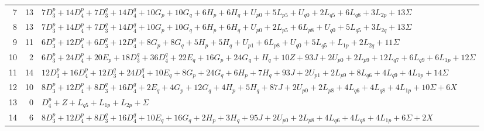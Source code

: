 \documentclass[11pt,a4paper]{article}
\theoremstyle{remark}
\begin{document}
\begin{longtable}{rrp{13.8cm}}
7&13&\( 7D_{3}^{p}+\allowbreak 14D_{4}^{p}+\allowbreak 7D_{3}^{q}+\allowbreak 14D_{4}^{q}+\allowbreak 10G_p+\allowbreak 10G_q+\allowbreak 6H_p+\allowbreak 6H_q+\allowbreak U_{p0}+\allowbreak 5L_{p5}+\allowbreak U_{q0}+\allowbreak 2L_{q5}+\allowbreak 6L_{q8}+\allowbreak 3L_{2p}+\allowbreak 13\Sigma \)\\
8&13&\( 7D_{3}^{p}+\allowbreak 14D_{4}^{p}+\allowbreak 7D_{3}^{q}+\allowbreak 14D_{4}^{q}+\allowbreak 10G_p+\allowbreak 10G_q+\allowbreak 6H_p+\allowbreak 6H_q+\allowbreak U_{p0}+\allowbreak 2L_{p5}+\allowbreak 6L_{p8}+\allowbreak U_{q0}+\allowbreak 5L_{q5}+\allowbreak 3L_{2q}+\allowbreak 13\Sigma \)\\
9&11&\( 6D_{3}^{p}+\allowbreak 12D_{4}^{p}+\allowbreak 6D_{3}^{q}+\allowbreak 12D_{4}^{q}+\allowbreak 8G_p+\allowbreak 8G_q+\allowbreak 5H_p+\allowbreak 5H_q+\allowbreak U_{p1}+\allowbreak 6L_{p8}+\allowbreak U_{q0}+\allowbreak 5L_{q5}+\allowbreak L_{1p}+\allowbreak 2L_{2q}+\allowbreak 11\Sigma \)\\
10&2&\( 6D_{3}^{p}+\allowbreak 24D_{4}^{p}+\allowbreak 20E_p+\allowbreak 18D_{3}^{q}+\allowbreak 36D_{4}^{q}+\allowbreak 22E_q+\allowbreak 16G_p+\allowbreak 24G_q+\allowbreak H_q+\allowbreak 10Z+\allowbreak 93J+\allowbreak 2U_{p0}+\allowbreak 2L_{p9}+\allowbreak 12L_{q7}+\allowbreak 6L_{q9}+\allowbreak 6L_{1p}+\allowbreak 12\Sigma \)\\
11&14&\( 12D_{3}^{p}+\allowbreak 16D_{4}^{p}+\allowbreak 12D_{3}^{q}+\allowbreak 24D_{4}^{q}+\allowbreak 10E_q+\allowbreak 8G_p+\allowbreak 24G_q+\allowbreak 6H_p+\allowbreak 7H_q+\allowbreak 93J+\allowbreak 2U_{p1}+\allowbreak 2L_{p9}+\allowbreak 8L_{q6}+\allowbreak 4L_{q9}+\allowbreak 4L_{1p}+\allowbreak 14\Sigma \)\\
12&10&\( 8D_{3}^{p}+\allowbreak 12D_{4}^{p}+\allowbreak 8D_{3}^{q}+\allowbreak 16D_{4}^{q}+\allowbreak 2E_q+\allowbreak 4G_p+\allowbreak 12G_q+\allowbreak 4H_p+\allowbreak 5H_q+\allowbreak 87J+\allowbreak 2U_{p0}+\allowbreak 2L_{p8}+\allowbreak 4L_{q6}+\allowbreak 4L_{q8}+\allowbreak 4L_{1p}+\allowbreak 10\Sigma+\allowbreak 6X \)\\
13&0&\( D_{4}^{p}+\allowbreak Z+\allowbreak L_{q5}+\allowbreak L_{1p}+\allowbreak L_{2p}+\allowbreak \Sigma \)\\
14&6&\( 8D_{3}^{p}+\allowbreak 12D_{4}^{p}+\allowbreak 8D_{3}^{q}+\allowbreak 16D_{4}^{q}+\allowbreak 10E_q+\allowbreak 16G_q+\allowbreak 2H_p+\allowbreak 3H_q+\allowbreak 95J+\allowbreak 2U_{p0}+\allowbreak 2L_{p8}+\allowbreak 4L_{q6}+\allowbreak 4L_{q8}+\allowbreak 4L_{1p}+\allowbreak 6\Sigma+\allowbreak 2X \)\\

\end{longtable}
\end{document}
